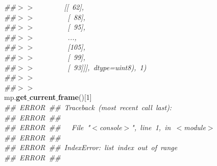 \mbox{}\textit{\#\#$>$$>$\ \ \ \ \ \ \ \ [[\ 62],} \\
\mbox{}\textit{\#\#$>$$>$\ \ \ \ \ \ \ \ \ [\ 88],} \\
\mbox{}\textit{\#\#$>$$>$\ \ \ \ \ \ \ \ \ [\ 95],} \\
\mbox{}\textit{\#\#$>$$>$\ \ \ \ \ \ \ \ \ ...,\ } \\
\mbox{}\textit{\#\#$>$$>$\ \ \ \ \ \ \ \ \ [105],} \\
\mbox{}\textit{\#\#$>$$>$\ \ \ \ \ \ \ \ \ [\ 99],} \\
\mbox{}\textit{\#\#$>$$>$\ \ \ \ \ \ \ \ \ [\ 93]]],\ dtype=uint8),\ 1)} \\
\mbox{}\textit{\#\#$>$$>$\ } \\
\mbox{}\textit{\#\#$>$$>$\ } \\
\mbox{}mp.\textbf{get$\_$current$\_$frame}()[1] \\
\mbox{}\textit{\#\#\ ERROR\ \#\#\ Traceback\ (most\ recent\ call\ last):} \\
\mbox{}\textit{\#\#\ ERROR\ \#\#\ } \\
\mbox{}\textit{\#\#\ ERROR\ \#\#\ \ \ File\ "{}$<$console$>$"{},\ line\ 1,\ in\ $<$module$>$} \\
\mbox{}\textit{\#\#\ ERROR\ \#\#\ } \\
\mbox{}\textit{\#\#\ ERROR\ \#\#\ IndexError:\ list\ index\ out\ of\ range} \\
\mbox{}\textit{\#\#\ ERROR\ \#\#\ } \\
\mbox{} \\
\mbox{}